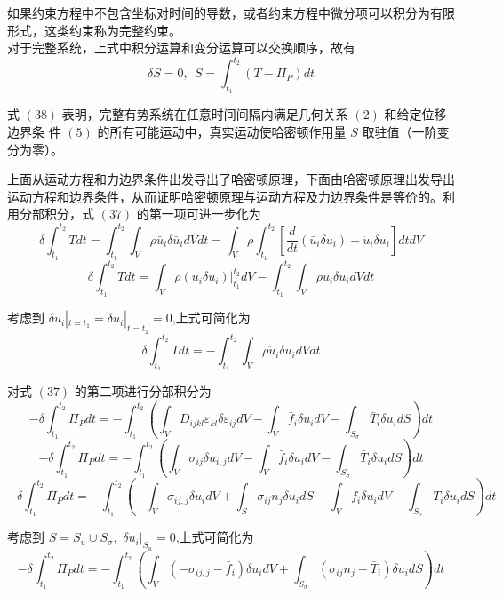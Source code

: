 \documentclass[12pt,a4paper]{article}
\begin{document}
如果约束方程中不包含坐标对时间的导数，或者约束方程中微分项可以积分为有限形式，这类约束称为完整约束。\\


对于完整系统，上式中积分运算和变分运算可以交换顺序，故有
\begin{equation}
\delta S=0,~~S=\int_{t_1}^{t_2}(T-\Pi _P)dt
\end{equation}

式 $(38)$ 表明，完整有势系统在任意时间间隔内满足几何关系 $(2)$ 和给定位移边界条
件 $(5)$ 的所有可能运动中，真实运动使哈密顿作用量 $S$ 取驻值（一阶变分为零）。

上面从运动方程和力边界条件出发导出了哈密顿原理，下面由哈密顿原理出发导出运动方程和边界条件，从而证明哈密顿原理与运动方程及力边界条件是等价的。利用分部积分，式 $(37)$ 的第一项可进一步化为
$$
\delta\int_{t_1}^{t_2}Tdt=\int_{t_1}^{t_2}\int_{V}\rho\bar{u}_i\delta\bar{u}_idVdt=\int_{V}\rho\int_{t_1}^{t_2}\left[\frac{d}{dt}(\bar{u}_i\delta u_i)-\ddot{u}_i\delta u_i\right]dtdV
$$
\begin{equation}
\delta\int_{t_1}^{t_2}Tdt=\int_{V}\rho(\bar{u}_i\delta u_i)|^{t_2}_{t_1}dV-\int_{t_1}^{t_2}\int_{V}\rho\ddot{u}_i\delta u_idVdt
\end{equation}

考虑到 $\delta u_i|_{t=t_1}=\delta u_i|_{t=t_2}=0$,上式可简化为
\begin{equation}
\delta\int_{t_1}^{t_2}Tdt=-\int_{t_1}^{t_2}\int_{V}\rho\ddot{u}_i\delta u_idVdt
\end{equation}

对式 $(37)$ 的第二项进行分部积分为
$$
-\delta\int_{t_1}^{t_2}\Pi _Pdt=-\int_{t_1}^{t_2}\left(\int_{V}D_{ijkl}\varepsilon_{kl}\delta\varepsilon_{ij}dV-\int_{V}\bar{f}_i\delta u_idV-\int_{S_{\sigma}}\bar{T}_i\delta u_idS\right)dt
$$
$$
-\delta\int_{t_1}^{t_2}\Pi _Pdt=-\int_{t_1}^{t_2}\left(\int_{V}\sigma_{ij}\delta u_{i,j}dV-\int_{V}\bar{f}_i\delta u_idV-\int_{S_{\sigma}}\bar{T}_i\delta u_idS\right)dt
$$
\begin{equation}
-\delta\int_{t_1}^{t_2}\Pi _Pdt=-\int_{t_1}^{t_2}\left(-\int_{V}\sigma_{ij,j}\delta u_idV+\int_{S}\sigma_{ij}n_j\delta u_idS-\int_{V}\bar{f}_i\delta u_idV-\int_{S_{\sigma}}\bar{T}_i\delta u_idS\right)dt
\end{equation}

考虑到 $S=S_u\cup S_{\sigma}$,~$\delta u_i|_{S_u}=0$,上式可简化为
\begin{equation}
-\delta\int_{t_1}^{t_2}\Pi _Pdt=-\int_{t_1}^{t_2}\left(\int_{V}(-\sigma_{ij,j}-\bar{f}_i)\delta u_idV+\int_{S_{\sigma}}(\sigma_{ij}n_j-\bar{T}_i)\delta u_idS\right)dt
\end{equation}
\end{document}
